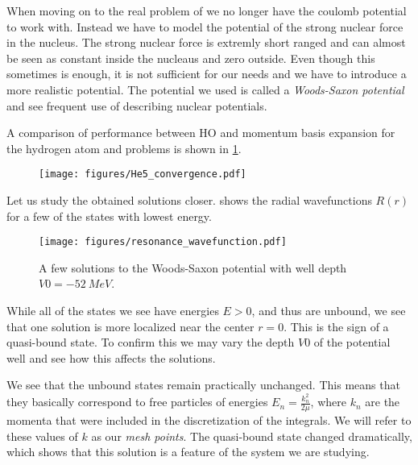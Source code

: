 
When moving on to the real problem of  we no longer have the coulomb potential to work with.
Instead we have to model the potential of the strong nuclear force in the  nucleus.
The strong nuclear force is extremly short ranged and can almost be seen as constant inside the nucleaus and zero outside.
Even though this sometimes is enough, it is not sufficient for our needs and we have to introduce a more realistic potential.
The potential we used is called a \emph{Woods-Saxon potential} and see frequent use of describing nuclear potentials.


A comparison of performance between HO and momentum basis expansion for the hydrogen atom and  problems is shown in \cref{fig:HO vs mom}.
\begin{figure}
  \centering
    \texttt{[image: figures/He5\_convergence.pdf]}
  \caption{}
  \label{fig:HO vs mom}
\end{figure}

Let us study the obtained solutions closer.  shows the radial wavefunctions $R(r)$ for a few of the states with lowest energy.

\begin{figure}
  \centering
  \texttt{[image: figures/resonance\_wavefunction.pdf]}
  \caption{A few solutions to the Woods-Saxon potential with well depth $V0=\SI{-52}{MeV}$.}
  \label{fig:resonance wavefunction}
\end{figure}

While all of the states we see have energies $E>0$, and thus are unbound, we see that one solution is more localized near the center $r=0$. 
This is the sign of a quasi-bound state. To confirm this we may vary the depth $V0$ of the potential well and see how this affects the solutions. 

We see that the unbound states remain practically unchanged. This means that they basically correspond to free particles of energies $E_n=\frac{k_n^2}{2\mu}$, where $k_n$ are the momenta that were included in the discretization of the integrals. We will refer to these values of $k$ as our \emph{mesh points}. The quasi-bound state changed dramatically, which shows that this solution is a feature of the system we are studying.  
